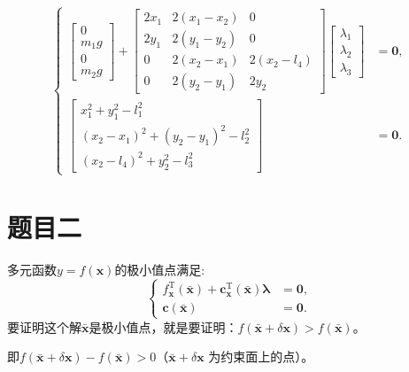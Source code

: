 \documentclass[fontset=fandol,12pt,a4paper]{ctexart}
\begin{document}
\[
	\left\{
	\begin{aligned}
		\begin{bmatrix} 0 \\ m_1 g \\ 0 \\ m_2 g \end{bmatrix}
		+ \begin{bmatrix}
			2x_1 & 2(x_1 - x_2) & 0             \\
			2y_1 & 2(y_1 - y_2) & 0             \\
			0    & 2(x_2 - x_1) & 2(x_2 - l_4)  \\
			0    & 2(y_2 - y_1) & 2y_2
		\end{bmatrix}
		\begin{bmatrix} \lambda_1 \\ \lambda_2 \\ \lambda_3 \end{bmatrix}
		 & = \boldsymbol{0} , \\[1.4em]
		\begin{bmatrix}
			x_1^2 + y_1^2 - l_1^2                  \\
			(x_2 - x_1)^2 + (y_2 - y_1)^2 - l_2^2  \\
			(x_2 - l_4)^2 + y_2^2 - l_3^2
		\end{bmatrix}
		 & = \boldsymbol{0} .
	\end{aligned}
	\right.
\]

\section{题目二}
多元函数$y=f(\boldsymbol{x})$的极小值点满足:
\begin{equation}
\label{eq:extremum}
    \left\{\begin{aligned}
f_{\boldsymbol{x}}^{\mathrm{T}}(\bar{\boldsymbol{x}})+\boldsymbol{c}_{\boldsymbol{x}}^{\mathrm{T}}(\bar{\boldsymbol{x}}) \boldsymbol{\lambda} & =\mathbf{0}, \\
\boldsymbol{c}(\bar{\boldsymbol{x}}) & =\mathbf{0} .
\end{aligned}\right.
\end{equation}
要证明这个解$\bar{\boldsymbol{x}}$是极小值点，就是要证明：$f(\bar{\boldsymbol{x}}+\delta \boldsymbol{x})>f(\bar{\boldsymbol{x}})$。

即$f(\bar{\boldsymbol{x}}+\delta \boldsymbol{x})-f(\bar{\boldsymbol{x}})>0$（$\bar{\boldsymbol{x}}+\delta \boldsymbol{x}$ 为约束面上的点）。
\end{document}
